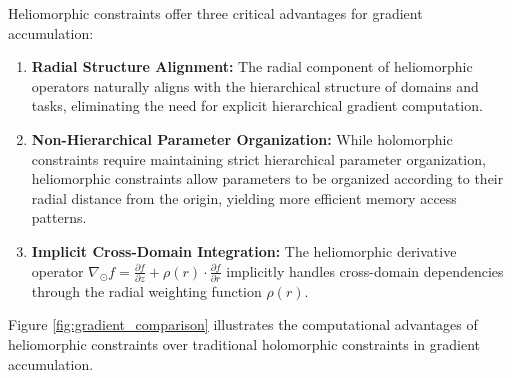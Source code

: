 Heliomorphic constraints offer three critical advantages for gradient accumulation:

\begin{enumerate}
    \item \textbf{Radial Structure Alignment:} The radial component of heliomorphic operators naturally aligns with the hierarchical structure of domains and tasks, eliminating the need for explicit hierarchical gradient computation.
    
    \item \textbf{Non-Hierarchical Parameter Organization:} While holomorphic constraints require maintaining strict hierarchical parameter organization, heliomorphic constraints allow parameters to be organized according to their radial distance from the origin, yielding more efficient memory access patterns.
    
    \item \textbf{Implicit Cross-Domain Integration:} The heliomorphic derivative operator $\nabla_{\odot} f = \frac{\partial f}{\partial z} + \rho(r) \cdot \frac{\partial f}{\partial r}$ implicitly handles cross-domain dependencies through the radial weighting function $\rho(r)$.
\end{enumerate}

Figure \ref{fig:gradient_comparison} illustrates the computational advantages of heliomorphic constraints over traditional holomorphic constraints in gradient accumulation.

